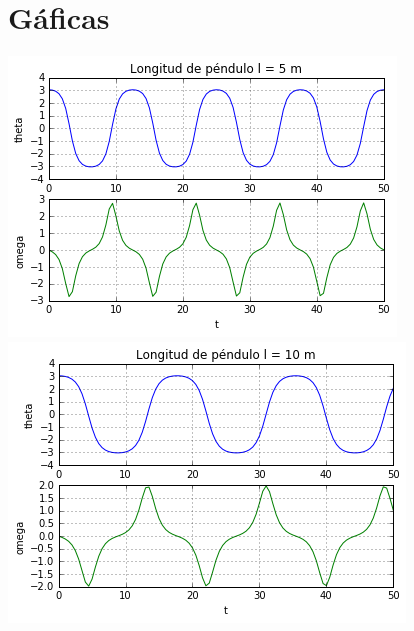 \documentclass[11pt,spanish]{article}
\begin{document}
\section*{Gáficas}

\centering

\includegraphics{graph1}\\
\includegraphics{graph2}\\
\end{document}
